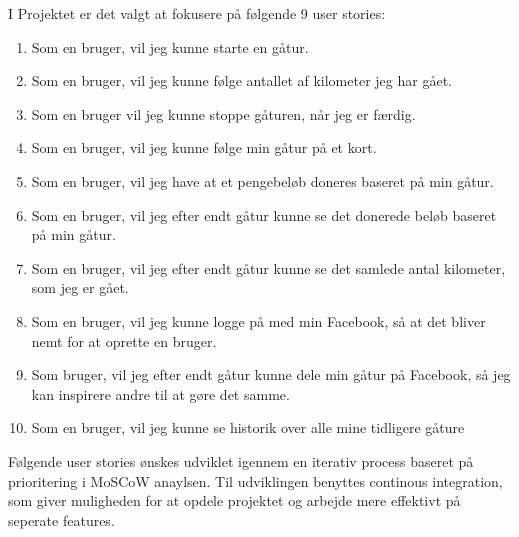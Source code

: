 I Projektet er det valgt at fokusere på følgende 9 user stories:
\begin{enumerate}

\item Som en bruger, vil jeg kunne starte en gåtur.
\item Som en bruger, vil jeg kunne følge antallet af kilometer jeg har gået. 
\item Som en bruger vil jeg kunne stoppe gåturen, når jeg er færdig. 
\item Som en bruger, vil jeg kunne følge min gåtur på et kort. 
\item Som en bruger, vil jeg have at et pengebeløb doneres baseret på min gåtur. 
\item Som en bruger, vil jeg efter endt gåtur kunne se det donerede beløb baseret på min gåtur. 
\item Som en bruger, vil jeg efter endt gåtur kunne se det samlede antal kilometer, som jeg er gået. 
\item Som en bruger, vil jeg kunne logge på med min Facebook, så at det bliver nemt for at oprette en bruger. 
\item Som bruger, vil jeg efter endt gåtur kunne dele min gåtur på Facebook, så jeg kan inspirere andre til at gøre det samme. 
\item Som en bruger, vil jeg kunne se historik over alle mine tidligere gåture
\end{enumerate}

Følgende user stories ønskes udviklet igennem en iterativ process baseret på prioritering i MoSCoW anaylsen. Til udviklingen benyttes continous integration, som giver muligheden for at opdele projektet og arbejde mere effektivt på seperate features.